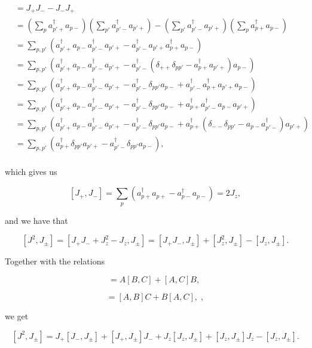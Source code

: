 \begin{align*}
[J_+,J_-] &= J_+ J_- - J_- J_+ \\
&= \left( \sum_p a_{p'+}^\dagger a_{p-} \right)
\left( \sum_{p'} a_{p'-}^\dagger a_{p'+} \right) -
\left( \sum_{p'} a_{p'-}^\dagger a_{p'+} \right)
\left( \sum_p a_{p+}^\dagger a_{p-} \right) \\
&= \sum_{p,p'} \left(
a_{p'+}^\dagger a_{p-} a_{p'-}^\dagger a_{p'+} -
a_{p'-}^\dagger a_{p'+} a_{p+}^\dagger a_{p-} \right) \\
&= \sum_{p,p'} \left(
a_{p'+}^\dagger a_{p-} a_{p'-}^\dagger a_{p'+} -
a_{p'-}^\dagger \left( \delta_{++} \delta_{pp'} -
a_{p+}^\dagger a_{p'+} \right) a_{p-} \right) \\
&= \sum_{p,p'} \left(
a_{p'+}^\dagger a_{p-} a_{p'-}^\dagger a_{p'+} -
a_{p'-}^\dagger \delta_{pp'} a_{p-} +
a_{p'-}^\dagger a_{p+}^\dagger a_{p'+} a_{p-} \right) \\
&= \sum_{p,p'} \left(
a_{p'+}^\dagger a_{p-} a_{p'-}^\dagger a_{p'+} -
a_{p'-}^\dagger \delta_{pp'} a_{p-} +
a_{p+}^\dagger a_{p'-}^\dagger a_{p-} a_{p'+} \right) \\
&= \sum_{p,p'} \left(
a_{p'+}^\dagger a_{p-} a_{p'-}^\dagger a_{p'+} -
a_{p'-}^\dagger \delta_{pp'} a_{p-} +
a_{p+}^\dagger \left( \delta_{--} \delta_{pp'} -
a_{p-} a_{p'-}^\dagger \right) a_{p'+} \right) \\
&= \sum_{p,p'} \left(
a_{p+}^\dagger \delta_{pp'} a_{p'+} -
a_{p'-}^\dagger \delta_{pp'} a_{p-} \right), \\
\end{align*}

which gives us

$$[J_+,J_-] = \sum_p \left(
a_{p+}^\dagger a_{p+} -
a_{p-}^\dagger a_{p-} \right) = 2J_z,$$

and we have that

$$[J^2, J_\pm] = [J_+ J_- + J_z^2 - J_z, J_\pm] =
[J_+ J_-, J_\pm] + [J_z^2, J_\pm] - [J_z, J_\pm].$$

Together with the relations

\begin{equation}
[AB,C] = A[B,C] + [A,C]B, \label{eq:ab,c} \;\end{equation}

\begin{equation} 
[A,BC] = [A,B]C + B[A,C], \label{eq:a,bc} \; ,
\end{equation}

we get

$$[J^2, J_\pm] =
J_+ [J_-,J_\pm] + [J_+,J_\pm] J_- + J_z [J_z,J_\pm] + [J_z,J_\pm] J_z - [J_z,J_\pm].$$

